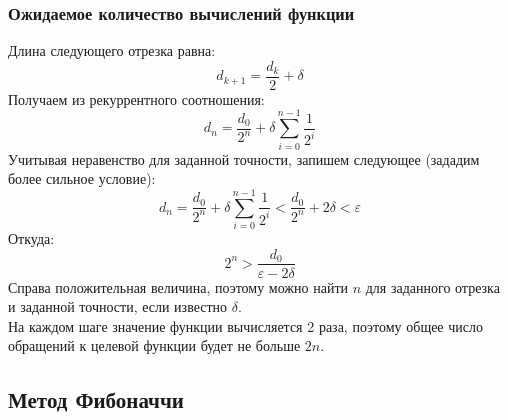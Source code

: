 \subsubsection{Ожидаемое количество вычислений функции}
Длина следующего отрезка равна:\\
\begin{equation}
d_{k+1}=\frac{d_k}{2}+\delta
\end{equation}
Получаем из рекуррентного соотношения:\\
\begin{equation}
d_{n}=\frac{d_0}{2^n}+\delta\sum_{i=0}^{n-1} \frac{1}{2^i}
\end{equation}
Учитывая неравенство для заданной точности, запишем следующее (зададим более сильное условие):\\
\begin{equation}
d_{n}=\frac{d_0}{2^n}+\delta\sum_{i=0}^{n-1} \frac{1}{2^i}<\frac{d_0}{2^n}+2\delta<\varepsilon
\end{equation}
Откуда:\\
\begin{equation}\label{dich}
2^n>\frac{d_0}{\varepsilon-2\delta}
\end{equation}
Справа положительная величина, поэтому можно найти $n$ для заданного отрезка и заданной точности, если известно $\delta$.\\
На каждом шаге значение функции вычисляется 2 раза, поэтому общее число обращений к целевой функции будет не больше $2n$.

\subsection{Метод Фибоначчи}
